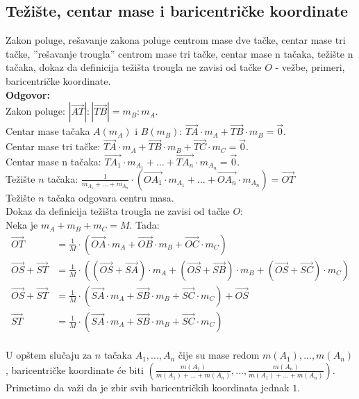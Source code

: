 \documentclass[12pt]{article}
\begin{document}
    \subsection{Težište, centar mase i baricentričke koordinate}
    Zakon poluge, rešavanje zakona poluge centrom mase dve tačke, centar
    mase tri tačke, ”rešavanje trougla” centrom mase tri tačke, centar
    mase n tačaka, težište n tačaka, dokaz da definicija težišta trougla
    ne zavisi od tačke $O$ - vežbe, primeri, baricentričke koordinate.
    \\
    \textbf{Odgovor:}\\
    Zakon poluge: $|\overrightarrow{AT}|:|\overrightarrow{TB}|=m_B:m_A$.\\
    Centar mase tačaka $A(m_A)$ i $B(m_B)$: $\overrightarrow{TA}\cdot m_A+\overrightarrow{TB}\cdot m_B=\overrightarrow{0}$.\\
    Centar mase tri tačke: $\overrightarrow{TA}\cdot m_A+\overrightarrow{TB}\cdot m_B+\overrightarrow{TC}\cdot m_C=\overrightarrow{0}$.\\
    Centar mase n tačaka: $\overrightarrow{TA_1}\cdot m_{A_1}+...+\overrightarrow{TA_n}\cdot m_{A_n}=\overrightarrow{0}$.\\
    Težište $n$ tačaka: $\frac{1}{m_{A_1}+...+m_{A_n}}\cdot(\overrightarrow{OA_1}\cdot m_{A_1}+...+\overrightarrow{OA_n}\cdot m_{A_n})=\overrightarrow{OT}$\\
    Težište $n$ tačaka odgovara centru masa.\\
    Dokaz da definicija težišta trougla ne zavisi od tačke $O$:\\
    Neka je $m_{A}+m_{B}+m_{C}=M$. Tada:
    \begin{align*}
        \overrightarrow{OT}                     & =\frac{1}{M}\cdot(\overrightarrow{OA}\cdot m_{A}+\overrightarrow{OB}\cdot m_{B}+\overrightarrow{OC}\cdot m_{C})                                                                   \\
        \overrightarrow{OS}+\overrightarrow{ST} & =\frac{1}{M}\cdot((\overrightarrow{OS}+\overrightarrow{SA})\cdot m_{A}+(\overrightarrow{OS}+\overrightarrow{SB})\cdot m_{B}+(\overrightarrow{OS}+\overrightarrow{SC})\cdot m_{C}) \\
        \overrightarrow{OS}+\overrightarrow{ST} & =\frac{1}{M}\cdot(\overrightarrow{SA}\cdot m_{A}+\overrightarrow{SB}\cdot m_{B}+\overrightarrow{SC}\cdot m_{C})+\overrightarrow{OS}                                               \\
        \overrightarrow{ST}                     & =\frac{1}{M}\cdot(\overrightarrow{SA}\cdot m_{A}+\overrightarrow{SB}\cdot m_{B}+\overrightarrow{SC}\cdot m_{C})
    \end{align*}\\
    U opštem slučaju za $n$ tačaka $A_1,...,A_n$ čije su mase redom $m(A_1),...,m(A_n)$, baricentričke koordinate će biti
$(\frac{m(A_1)}{m(A_1)+...+m(A_n)},...,\frac{m(A_n)}{m(A_1)+...+m(A_n)})$. Primetimo da važi da je zbir svih baricentričkih
    koordinata jednak $1$.
\end{document}

